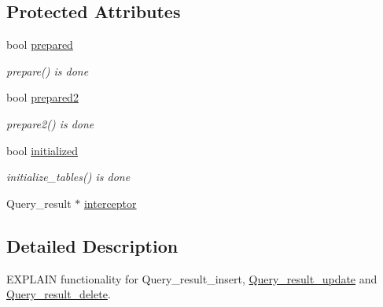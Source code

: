 \subsection*{Protected Attributes}
\begin{DoxyCompactItemize}
\item 
\mbox{\label{classQuery__result__explain_a2803be1670f20974726da4fbba9b8e98}} 
bool \mbox{\hyperlink{classQuery__result__explain_a2803be1670f20974726da4fbba9b8e98}{prepared}}
\begin{DoxyCompactList}\small\item\em prepare() is done \end{DoxyCompactList}\item 
\mbox{\label{classQuery__result__explain_af51c0df15caf04982e3e5ebf4472ec59}} 
bool \mbox{\hyperlink{classQuery__result__explain_af51c0df15caf04982e3e5ebf4472ec59}{prepared2}}
\begin{DoxyCompactList}\small\item\em prepare2() is done \end{DoxyCompactList}\item 
\mbox{\label{classQuery__result__explain_a39e85738c3ad26c06bc643f1ea83cb66}} 
bool \mbox{\hyperlink{classQuery__result__explain_a39e85738c3ad26c06bc643f1ea83cb66}{initialized}}
\begin{DoxyCompactList}\small\item\em initialize\+\_\+tables() is done \end{DoxyCompactList}\item 
Query\+\_\+result $\ast$ \mbox{\hyperlink{classQuery__result__explain_abc8bbaa560825ef50d349690eee44037}{interceptor}}
\end{DoxyCompactItemize}


\subsection{Detailed Description}
E\+X\+P\+L\+A\+IN functionality for Query\+\_\+result\+\_\+insert, \mbox{\hyperlink{classQuery__result__update}{Query\+\_\+result\+\_\+update}} and \mbox{\hyperlink{classQuery__result__delete}{Query\+\_\+result\+\_\+delete}}.

